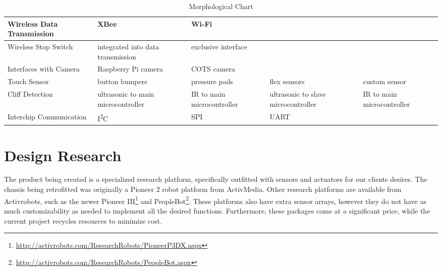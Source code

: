 \documentclass{article}
\begin{document}
\begin{table}
\begin{tabularx}{\textwidth}{|X||Y|Y|Y|Y|}
                Wireless Data \mbox{Transmission}
                    & XBee
                    & Wi-Fi
                    &
                    &
                \\ \hline
                Wireless Stop Switch
                    & integrated into data transmission
                    & exclusive interface
                    &
                    &
                \\ \hline
                Interfaces with \mbox{Camera}
                    & Raspberry Pi camera
                    & COTS camera
                    &
                    &
                \\ \hline
                Touch Sensor
                    & button bumpers
                    & pressure pads
                    & flex sensors
                    & custom sensor
                \\ \hline
                Cliff Detection
                    & ultrasonic to main microcontroller
                    & IR to main microcontroller
                    & ultrasonic to slave microcontroller
                    & IR to main microcontroller
                \\ \hline
                Interchip \mbox{Communication}
                    & I\textsuperscript{2}C
                    & SPI
                    & UART
                    &
                \\ \hline
            \end{tabularx}
            \caption{Morphological Chart}
            \label{tab:morphchart}
        \end{table}

\FloatBarrier
\section{Design Research} %
    \label{sec:design_research}
    
    The product being created is a specialized research platform, specifically
    outfitted with sensors and actuators for our clients desires.
    The chassis being retrofitted was originally a Pioneer 2 robot platform from ActivMedia.
    Other research platforms are available from Activrobots, such as the newer
    Pioneer III\footnote{\url{http://activrobots.com/ResearchRobots/PioneerP3DX.aspx}}
    and PeopleBot\footnote{\url{http://activrobots.com/ResearchRobots/PeopleBot.aspx}}. 
    These platforms also have extra sensor arrays,
    however they do not have as much customizability as needed to implement all
    the desired functions.
    Furthermore, these packages come at a significant price,
    while the current project recycles resources to minimize cost.
    
\end{document}
